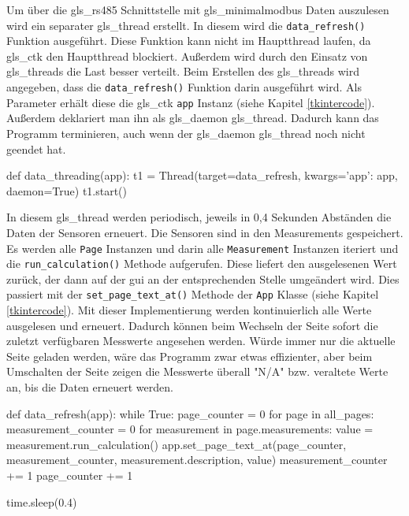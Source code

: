 \label{auslesen_rlt_parameter}

Um über die \gls{gls_rs485} Schnittstelle mit \gls{gls_minimalmodbus} Daten auszulesen wird ein separater \gls{gls_thread} erstellt. In diesem wird die \lstinline{data_refresh()} Funktion ausgeführt. Diese Funktion kann nicht im Hauptthread laufen, da \gls{gls_ctk} den Hauptthread blockiert. Außerdem wird durch den Einsatz von \gls{gls_thread}s die Last besser verteilt. Beim Erstellen des \gls{gls_thread}s wird angegeben, dass die \lstinline{data_refresh()} Funktion darin ausgeführt wird. Als Parameter erhält diese die \gls{gls_ctk} \lstinline{app} Instanz (siehe Kapitel \ref{tkintercode}). Außerdem deklariert man ihn als \gls{gls_daemon} \gls{gls_thread}. Dadurch kann das Programm terminieren, auch wenn der \gls{gls_daemon} \gls{gls_thread} noch nicht geendet hat.

\begin{pythoncode}
def data_threading(app):
	t1 = Thread(target=data_refresh, kwargs={'app': app}, daemon=True)
	t1.start()
\end{pythoncode}

In diesem \gls{gls_thread} werden periodisch, jeweils in 0,4 Sekunden Abständen die Daten der Sensoren erneuert. Die Sensoren sind in den Measurements gespeichert. Es werden alle \lstinline{Page} Instanzen und darin alle \lstinline{Measurement} Instanzen iteriert und die \lstinline{run_calculation()} Methode aufgerufen. Diese liefert den ausgelesenen Wert zurück, der dann auf der \acs{gui} an der entsprechenden Stelle umgeändert wird. Dies passiert mit der \lstinline{set_page_text_at()} Methode der \lstinline{App} Klasse (siehe Kapitel \ref{tkintercode}). 
\newline Mit dieser Implementierung werden kontinuierlich alle Werte ausgelesen und erneuert. Dadurch können beim Wechseln der Seite sofort die zuletzt verfügbaren Messwerte angesehen werden. Würde immer nur die aktuelle Seite geladen werden, wäre das Programm zwar etwas effizienter, aber beim Umschalten der Seite zeigen die Messwerte überall "N/A" bzw. veraltete Werte an, bis die Daten erneuert werden. 

\begin{pythoncode}
def data_refresh(app):
	while True:
		page_counter = 0
		for page in all_pages:
			measurement_counter = 0
			for measurement in page.measurements:
				value = measurement.run_calculation()
				app.set_page_text_at(page_counter, measurement_counter, measurement.description, value)
				measurement_counter += 1
			page_counter += 1
		
		time.sleep(0.4)
\end{pythoncode}

